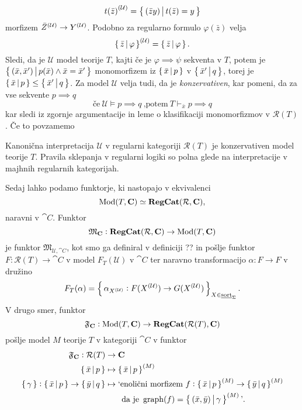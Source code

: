 \documentclass[../kategoricna_logika.tex]{subfiles}
\begin{document}
$${t(\bar{z})}^{(\mathcal{U})} = \left\lbrace\,(\bar{z}y)\,\middle|\, t(\bar{z}) = y\,\right\rbrace$$
morfizem ${\bar{Z}}^{(\mathcal{U})} \to {Y}^{(\mathcal{U})}$. Podobno za regularno formulo $\varphi(\bar{z})$ velja 
$${\left\lbrace\,\bar{z}\,\middle|\, \varphi\,\right\rbrace}^{(\mathcal{U})} = \left\lbrace\,\bar{z}\,\middle|\, \varphi\,\right\rbrace.$$
Sledi, da je $\mathcal{U}$ model teorije $T$, kajti če je $\varphi \implies \psi$ sekventa v $T$,
potem je $\left\lbrace\,(\bar{x}, \bar{x}')\,\middle|\, p(\bar{x}) \wedge \bar{x}= \bar{x}'\,\right\rbrace$
monomorfizem iz $\left\lbrace\,\bar{x}\,\middle|\, p\,\right\rbrace$ v $\left\lbrace\,\bar{x}'\,\middle|\, q\,\right\rbrace$,
torej je $\left\lbrace\,\bar{x}\,\middle|\, p\,\right\rbrace \leq \left\lbrace\,\bar{x}'\,\middle|\, q\,\right\rbrace$.
Za model $\mathcal{U}$ velja tudi, da je \emph{konzervativen}, kar pomeni,
da za vse sekvente $p \implies q$
$$\text{če} \ \mathcal{U} \models p \implies q \ \text{,potem} \ T \vdash_{\bar{x}} p \implies q$$
kar sledi iz zgornje argumentacije in leme o klasifikaciji monomorfizmov v $\mathcal{R}(T)$.
Če to povzamemo 
\begin{izrek}
  Kanonična interpretacija $\mathcal{U}$ v regularni kategoriji $\mathcal{R}(T)$ je konzervativen model teorije $T$. Pravila sklepanja v regularni logiki so polna glede na interpretacije v majhnih regularnih kategorijah.
\end{izrek}
Sedaj lahko podamo funktorje, ki nastopajo v ekvivalenci 
$$\operatorname{Mod}(T, {\operatorname{\mathbf{C}}}) \simeq {\operatorname{\mathbf{RegCat}}}(\mathcal{R}, {\operatorname{\mathbf{C}}}),$$
naravni v $\cat{C}$. Funktor 
$$\mathfrak{M}_{{\operatorname{\mathbf{C}}}} : {\operatorname{\mathbf{RegCat}}}(\mathcal{R}, {\operatorname{\mathbf{C}}}) \to \operatorname{Mod}(T, {\operatorname{\mathbf{C}}})$$
je funktor $\mathfrak{M}_{\mathcal{U}, \cat{C}}$, kot smo ga definiral v definiciji ?? in pošlje funktor $F : \mathcal{R}(T) \to \cat{C}$ v model $F_T(\mathcal{U})$ v $\cat{C}$ ter naravno transformacijo $\alpha : F \to F$ v družino
$$F_T(\alpha) = \left\lbrace\,\alpha_{{X}^{(\mathcal{U})}} : F({X}^{(\mathcal{U})}) \to G({X}^{(\mathcal{U})})\,\right\rbrace_{X \in \underline{\mathrm{sort}}_{\Sigma}}.$$
V drugo smer, funktor 
$$\mathfrak{F}_{{\operatorname{\mathbf{C}}}} : \operatorname{Mod}(T, {\operatorname{\mathbf{C}}}) \to {\operatorname{\mathbf{RegCat}}}(\mathcal{R}(T), {\operatorname{\mathbf{C}}})$$
pošlje model $M$ teorije $T$ v kategoriji $\cat{C}$ v funktor
\begin{align*}
  \mathfrak{F}_{{\operatorname{\mathbf{C}}}} : \mathcal{R}(T) &\to {\operatorname{\mathbf{C}}}\\
  \left\lbrace\,\bar{x}\,\middle|\, p\,\right\rbrace &\mapsto \left\lbrace\,\bar{x}\,\middle|\, p\,\right\rbrace^{(M)} \\
  \left\lbrace\,\gamma\,\right\rbrace : \left\lbrace\,\bar{x}\,\middle|\, p\,\right\rbrace \to \left\lbrace\,\bar{y}\,\middle|\, q\,\right\rbrace &\mapsto \text{`enolični morfizem} \ f : \left\lbrace\,\bar{x}\,\middle|\, p\,\right\rbrace^{(M)} \to \left\lbrace\,\bar{y}\,\middle|\, q\,\right\rbrace^{(M)} \\ 
  &\qquad \text{da je} \ \operatorname{graph}(f) = \left\lbrace\,(\bar{x}, \bar{y}) \,\middle|\, \gamma\,\right\rbrace^{(M)} \text{'}.
\end{align*}
\end{document}
